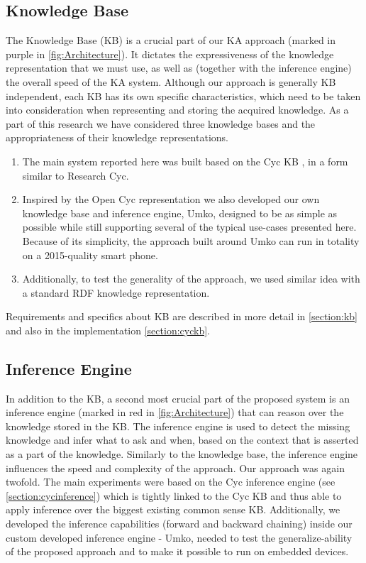 \subsection{Knowledge Base}
\label{section:bg:kb}
The Knowledge Base (KB) is a crucial part of our KA approach 
(marked in purple in \autoref{fig:Architecture}). It dictates the expressiveness 
of the knowledge representation that we must use, as well as 
(together with the inference engine) the overall speed of the KA system. 
Although our approach is generally KB independent, each KB has its own 
specific characteristics, which need to be taken into consideration when 
representing and storing the acquired knowledge. As a part of this research we 
have considered three knowledge bases and the appropriateness of their 
knowledge representations.
\begin{enumerate}
\item The main system reported here was built based on the Cyc KB
\parencite{Lenat1995}, in a form similar to Research Cyc. 
\item Inspired by the Open Cyc representation we also developed our own 
knowledge base and inference engine, Umko, designed to be as simple as possible
while still supporting several of the typical use-cases presented here. 
Because of its simplicity, the approach built around Umko can run in totality 
on a 2015-quality smart phone.
\item Additionally, to test the generality of the approach, we used similar 
idea with a standard RDF knowledge representation\parencite{Bradesko2012}.
\end{enumerate}

Requirements and specifics about KB are described in more detail in 
\autoref{section:kb} and also in the implementation \autoref{section:cyckb}.

\subsection{Inference Engine}
\label{section:bg:inference}
In addition to the KB, a second most crucial part of the proposed system is an 
inference engine (marked in red in \autoref{fig:Architecture}) that can reason 
over the knowledge stored in the KB. The inference engine is used to detect 
the missing knowledge and infer what to ask and when, based on the context 
that is asserted as a part of the knowledge. Similarly to the knowledge base, 
the inference engine influences the speed and complexity of the approach. Our 
approach was again twofold. The main experiments were based on the Cyc 
inference engine (see \autoref{section:cycinference}) which is tightly linked 
to the Cyc KB and thus able to apply inference over the biggest existing 
common sense KB. Additionally, we developed the inference capabilities 
(forward and backward chaining) inside our custom developed inference 
engine - Umko, needed to test the generalize-ability of the proposed approach 
and to make it possible to run on embedded devices.

